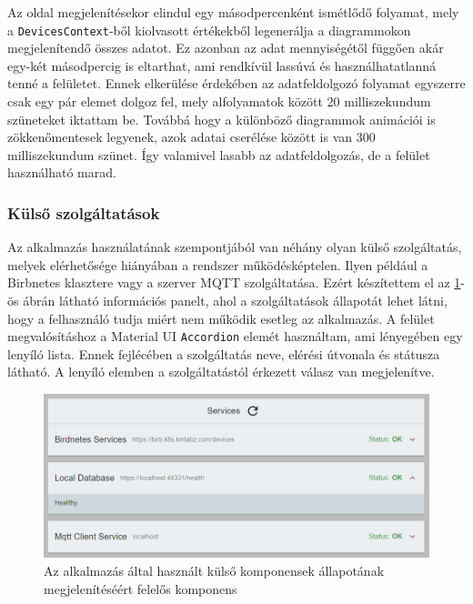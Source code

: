 Az oldal megjelenítésekor elindul egy másodpercenként ismétlődő folyamat,
mely a \verb+DevicesContext+-ből kiolvasott értékekből legenerálja a diagrammokon megjelenítendő összes adatot.
Ez azonban az adat mennyiségétől függően akár egy-két másodpercig is eltarthat, ami rendkívül lassúvá és használhatatlanná tenné a felületet.
Ennek elkerülése érdekében az adatfeldolgozó folyamat egyszerre csak egy pár elemet dolgoz fel, mely alfolyamatok között 20 milliszekundum szüneteket iktattam be.
Továbbá hogy a különböző diagrammok animációi is zökkenőmentesek legyenek, azok adatai cserélése között is van 300 milliszekundum szünet.
Így valamivel lasabb az adatfeldolgozás, de a felület használható marad.
\subsubsection{Külső szolgáltatások}
Az alkalmazás használatának szempontjából van néhány olyan külső szolgáltatás, melyek elérhetősége hiányában a rendszer működésképtelen.
Ilyen például a Birbnetes klasztere vagy a szerver MQTT szolgáltatása. 
Ezért készítettem el az \ref{fig:dashboard-services-loaded}-ös ábrán látható információs panelt, ahol a szolgáltatások állapotát lehet látni, hogy a felhasználó tudja miért nem működik esetleg az alkalmazás.
A felület megvalósításhoz a Material UI \verb+Accordion+ elemét használtam, ami lényegében egy lenyíló lista. 
Ennek fejlécében a szolgáltatás neve, elérési útvonala és státusza látható. A lenyíló elemben a szolgáltatástól érkezett válasz van megjelenítve. 

\begin{figure}[!ht]
    \centering
    \includegraphics[width=150mm, keepaspectratio]{figures/dashboard-services-loaded.png}
    \caption{Az alkalmazás által használt külső komponensek állapotának megjelenítéséért felelős komponens}
    \label{fig:dashboard-services-loaded}
\end{figure}

